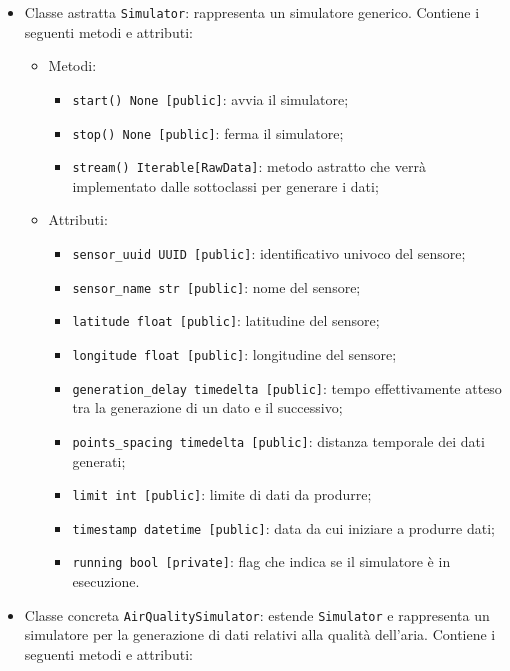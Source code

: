 \begin{itemize}
	\item Classe astratta \texttt{Simulator}: rappresenta un simulatore generico. Contiene i seguenti metodi e attributi:
	      \begin{itemize}
		      \item Metodi:
		            \begin{itemize}
			            \item \texttt{start() None [public]}: avvia il simulatore;
			            \item \texttt{stop() None [public]}: ferma il simulatore;
			            \item \texttt{stream() Iterable[RawData]}: metodo astratto che verrà implementato dalle sottoclassi per generare i dati;
		            \end{itemize}
		      \item Attributi:
		            \begin{itemize}
			            \item \texttt{sensor\_uuid UUID [public]}: identificativo univoco del sensore;
			            \item \texttt{sensor\_name str [public]}: nome del sensore;
			            \item \texttt{latitude float [public]}: latitudine del sensore;
			            \item \texttt{longitude float [public]}: longitudine del sensore;
			            \item \texttt{generation\_delay timedelta [public]}: tempo effettivamente atteso tra la generazione di un dato e il successivo;
			            \item \texttt{points\_spacing timedelta [public]}: distanza temporale dei dati generati;
			            \item \texttt{limit int [public]}: limite di dati da produrre;
			            \item \texttt{timestamp datetime [public]}: data da cui iniziare a produrre dati;
			            \item \texttt{running bool [private]}: flag che indica se il simulatore è in esecuzione.
		            \end{itemize}
	      \end{itemize}
	\item Classe concreta \texttt{AirQualitySimulator}: estende \texttt{Simulator} e rappresenta un simulatore per la generazione di dati relativi alla qualità dell'aria. Contiene i seguenti metodi e attributi:

\end{itemize}
